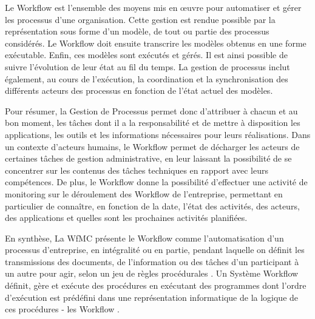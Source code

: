  	 Le Workflow est l’ensemble des moyens mis en œuvre pour automatiser et gérer les processus d’une organisation. Cette gestion est rendue possible par la représentation sous forme d’un modèle, de tout ou partie des processus considérés. Le Workflow doit ensuite transcrire les modèles obtenus en une forme exécutable. Enfin, ces modèles sont exécutés et gérés. Il est ainsi possible de suivre l’évolution de leur état au fil du temps. La gestion de processus inclut également, au cours de l’exécution, la coordination et la synchronisation des différents acteurs des processus en fonction de l’état actuel des modèles.
 	 
 	 Pour résumer, la Gestion de Processus permet donc d’attribuer à chacun et au bon moment, les tâches dont il a la responsabilité et de mettre à disposition les applications, les outils et les informations nécessaires pour leurs réalisations. Dans un contexte d’acteurs humains, le Workflow permet de décharger les acteurs de certaines tâches de gestion administrative, en leur laissant la possibilité de se concentrer sur les contenus des tâches techniques en rapport avec leurs compétences. De plus, le Workflow donne la possibilité d’effectuer une activité de monitoring sur le déroulement des Workflow de l’entreprise, permettant en particulier de connaître, en fonction de la date, l’état des activités, des acteurs, des applications et quelles sont les prochaines activités planifiées. 
 	 
 	 En synthèse, La WfMC présente le Workflow comme l’automatisation d’un processus d’entreprise, en intégralité ou en partie, pendant laquelle on définit les transmissions des documents, de l’information ou des tâches d’un participant à un autre pour agir, selon un jeu de règles procédurales \parencite{WFMC11}. Un Système Workflow définit, gère et exécute des procédures en exécutant des programmes dont l’ordre d’exécution est prédéfini dans une représentation informatique de la logique de ces procédures - les Workflow \parencite{WFMC11}. 
 	 
